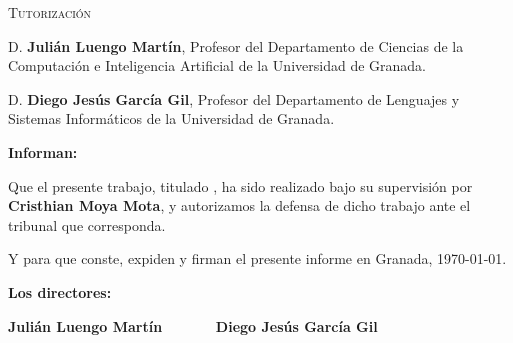 %
\cleardoublepage           %

\hfill\vfill

\textsc{Tutorización}\\\bigskip



D. \textbf{Julián Luengo Martín}, Profesor del Departamento de Ciencias de la Computación e Inteligencia Artificial
de la Universidad de Granada.
\vspace{0.5cm}

D. \textbf{Diego Jesús García Gil}, Profesor del Departamento de Lenguajes y Sistemas Informáticos de la Universidad de Granada.

\vspace{0.5cm}

\textbf{Informan:}

\vspace{0.5cm}

Que el presente trabajo, titulado \textit{\miTitulo},
ha sido realizado bajo su supervisión por \textbf{Cristhian Moya Mota}, y autorizamos la defensa de dicho trabajo ante el tribunal
que corresponda.

\vspace{0.5cm}

Y para que conste, expiden y firman el presente informe en Granada, \today.

\vspace{1cm}

\textbf{Los directores:}

\vspace{5cm}

\begin{center}
	\textbf{Julián Luengo Martín \ \ \ \ \ \ Diego Jesús García Gil}
\end{center}

\vfill

\cleardoublepage 
\endinput
